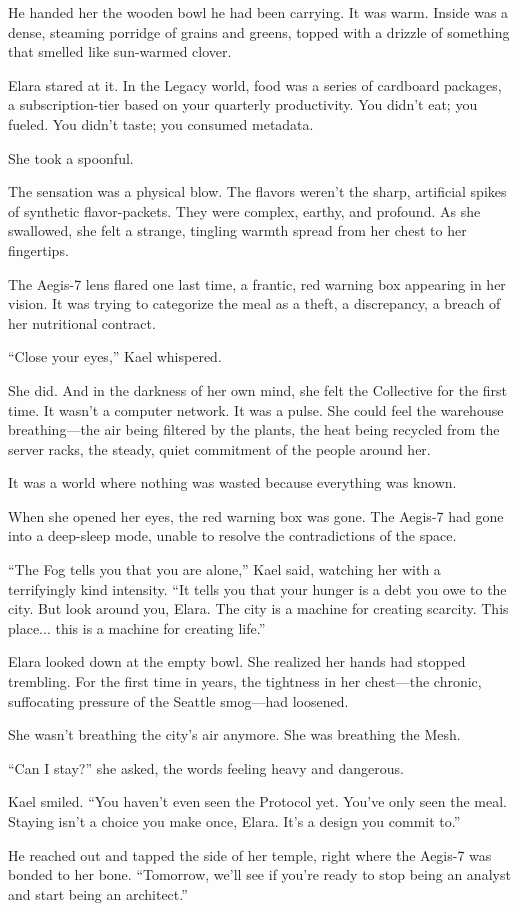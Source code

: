 He handed her the wooden bowl he had been carrying. It was warm. Inside was a dense, steaming porridge of grains and greens, topped with a drizzle of something that smelled like sun-warmed clover. 

Elara stared at it. In the Legacy world, food was a series of cardboard packages, a subscription-tier based on your quarterly productivity. You didn't eat; you fueled. You didn't taste; you consumed metadata.

She took a spoonful. 

The sensation was a physical blow. The flavors weren't the sharp, artificial spikes of synthetic flavor-packets. They were complex, earthy, and profound. As she swallowed, she felt a strange, tingling warmth spread from her chest to her fingertips. 


The Aegis-7 lens flared one last time, a frantic, red warning box appearing in her vision. It was trying to categorize the meal as a theft, a discrepancy, a breach of her nutritional contract. 

``Close your eyes,'' Kael whispered. 

She did. And in the darkness of her own mind, she felt the Collective for the first time. It wasn't a computer network. It was a pulse. She could feel the warehouse breathing—the air being filtered by the plants, the heat being recycled from the server racks, the steady, quiet commitment of the people around her. 

It was a world where nothing was wasted because everything was known.



When she opened her eyes, the red warning box was gone. The Aegis-7 had gone into a deep-sleep mode, unable to resolve the contradictions of the space. 

``The Fog tells you that you are alone,'' Kael said, watching her with a terrifyingly kind intensity. ``It tells you that your hunger is a debt you owe to the city. But look around you, Elara. The city is a machine for creating scarcity. This place... this is a machine for creating life.''

Elara looked down at the empty bowl. She realized her hands had stopped trembling. For the first time in years, the tightness in her chest—the chronic, suffocating pressure of the Seattle smog—had loosened. 

She wasn't breathing the city's air anymore. She was breathing the Mesh.

``Can I stay?'' she asked, the words feeling heavy and dangerous.

Kael smiled. ``You haven't even seen the Protocol yet. You've only seen the meal. Staying isn't a choice you make once, Elara. It's a design you commit to.''

He reached out and tapped the side of her temple, right where the Aegis-7 was bonded to her bone. ``Tomorrow, we’ll see if you’re ready to stop being an analyst and start being an architect.''
